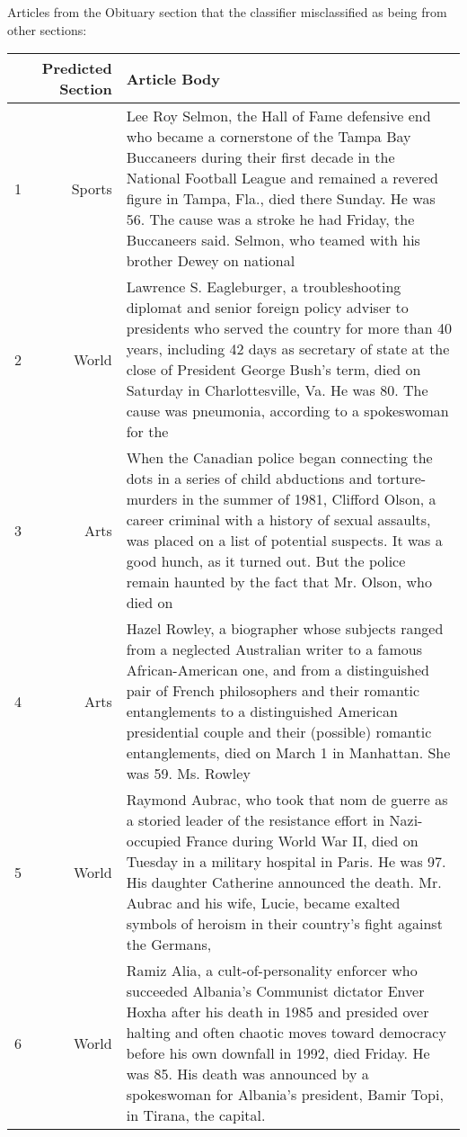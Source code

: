 \documentclass{article}
\begin{document}
Articles from the Obituary section that the classifier misclassified as being from other sections:
\begin{table}[H]
\begin{tabular}{lrp{3in}}
  \hline
 & Predicted Section & Article Body \\ 
  \hline
1 & Sports & Lee Roy Selmon, the Hall of Fame defensive end who became a cornerstone of the Tampa Bay Buccaneers during their first decade in the National Football League and remained a revered figure in Tampa, Fla., died there Sunday. He was 56. The cause was a stroke he had Friday, the Buccaneers said. Selmon, who teamed with his brother Dewey on national \\ 
  2 & World & Lawrence S. Eagleburger, a troubleshooting diplomat and senior foreign policy adviser to presidents who served the country for more than 40 years, including 42 days as secretary of state at the close of President George Bush's term, died on Saturday in Charlottesville, Va. He was 80. The cause was pneumonia, according to a spokeswoman for the \\ 
  3 & Arts & When the Canadian police began connecting the dots in a series of child abductions and torture-murders in the summer of 1981, Clifford Olson, a career criminal with a history of sexual assaults, was placed on a list of potential suspects. It was a good hunch, as it turned out. But the police remain haunted by the fact that Mr. Olson, who died on \\ 
  4 & Arts & Hazel Rowley, a biographer whose subjects ranged from a neglected Australian writer to a famous African-American one, and from a distinguished pair of French philosophers and their romantic entanglements to a distinguished American presidential couple and their (possible) romantic entanglements, died on March 1 in Manhattan. She was 59. Ms. Rowley \\ 
  5 & World & Raymond Aubrac, who took that nom de guerre as a storied leader of the resistance effort in Nazi-occupied France during World War II, died on Tuesday in a military hospital in Paris. He was 97. His daughter Catherine announced the death. Mr. Aubrac and his wife, Lucie, became exalted symbols of heroism in their country's fight against the Germans, \\ 
  6 & World & Ramiz Alia, a cult-of-personality enforcer who succeeded Albania's Communist dictator Enver Hoxha after his death in 1985 and presided over halting and often chaotic moves toward democracy before his own downfall in 1992, died Friday. He was 85. His death was announced by a spokeswoman for Albania's president, Bamir Topi, in Tirana, the capital. \\ 

\end{tabular}
\end{table}
\end{document}
